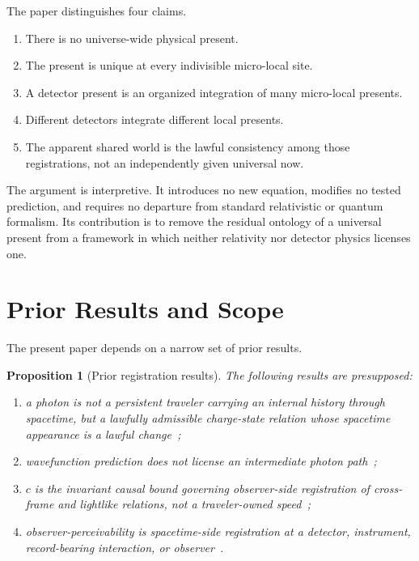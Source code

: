 \documentclass[12pt,onecolumn]{article}
\newtheorem{proposition}{Proposition}[section]
\begin{document}
The paper distinguishes four claims.

\begin{enumerate}
\item There is no universe-wide physical present.
\item The present is unique at every indivisible micro-local site.
\item A detector present is an organized integration of many micro-local presents.
\item Different detectors integrate different local presents.
\item The apparent shared world is the lawful consistency among those registrations, not an independently given universal now.
\end{enumerate}

The argument is interpretive. It introduces no new equation, modifies no tested prediction, and requires no departure from standard relativistic or quantum formalism. Its contribution is to remove the residual ontology of a universal present from a framework in which neither relativity nor detector physics licenses one.

\section{Prior Results and Scope}

The present paper depends on a narrow set of prior results.

\begin{proposition}[Prior registration results]
\label{prop:prior-results}
The following results are presupposed:

\begin{enumerate}
\item a photon is not a persistent traveler carrying an internal history through spacetime, but a lawfully admissible charge-state relation whose spacetime appearance is a lawful change~\cite{Bedrock};
\item wavefunction prediction does not license an intermediate photon path~\cite{Timebound};
\item \(c\) is the invariant causal bound governing observer-side registration of cross-frame and lightlike relations, not a traveler-owned speed~\cite{RegistrationBound};
\item observer-perceivability is spacetime-side registration at a detector, instrument, record-bearing interaction, or observer~\cite{ObserverPerceivability}.
\end{enumerate}
\end{proposition}
\end{document}
